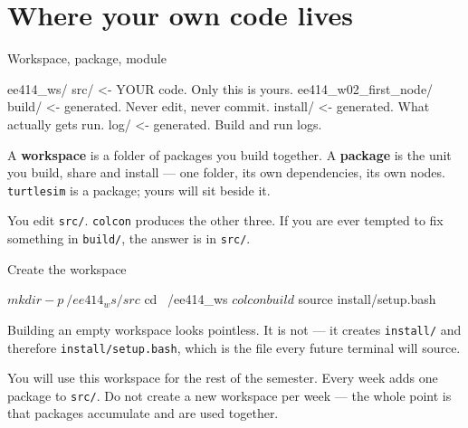 \documentclass[aspectratio=169]{beamer}
\begin{document}
\section{Where your own code lives}

\begin{frame}[fragile]{Workspace, package, module}
  \begin{shells}
ee414_ws/
  src/                    <- YOUR code. Only this is yours.
    ee414_w02_first_node/
  build/                  <- generated. Never edit, never commit.
  install/                <- generated. What actually gets run.
  log/                    <- generated. Build and run logs.
  \end{shells}

  \vspace{0.5em}
  \small
  A \textbf{workspace} is a folder of packages you build together. A \textbf{package} is the
  unit you build, share and install --- one folder, its own dependencies, its own nodes.
  \texttt{turtlesim} is a package; yours will sit beside it.

  \vspace{0.3em}
  \footnotesize
  You edit \texttt{src/}. \texttt{colcon} produces the other three. If you are ever tempted to
  fix something in \texttt{build/}, the answer is in \texttt{src/}.
\end{frame}

\begin{frame}[fragile]{Create the workspace}
  \begin{shells}
$ mkdir -p ~/ee414_ws/src
$ cd ~/ee414_ws
$ colcon build
$ source install/setup.bash
  \end{shells}

  \vspace{0.5em}
  \small
  Building an empty workspace looks pointless. It is not --- it creates \texttt{install/} and
  therefore \texttt{install/setup.bash}, which is the file every future terminal will source.

  \vspace{0.6em}
  \begin{inthefield}
    \footnotesize
    You will use this workspace for the rest of the semester. Every week adds one package to
    \texttt{src/}. Do not create a new workspace per week --- the whole point is that packages
    accumulate and are used together.
  \end{inthefield}
\end{frame}
\end{document}
